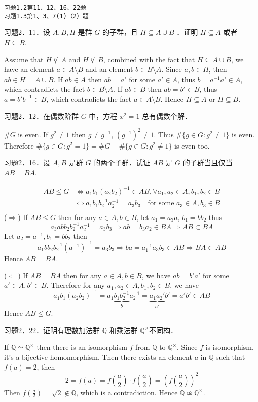 \begin{lstlisting}
习题1.2第11、12、16、22题
习题1.3第1、3、7(1)（2）题
\end{lstlisting}
\begin{exercise}
习题2．11．设 $A, B, H$ 是群 $G$ 的子群，且 $H \subseteq A \cup B$ ．证明 $H \subseteq A$ 或者 $H \subseteq B$.
\end{exercise}
Assume that $H\not\subseteq A$ and $H\not\subseteq B$, combined with the fact that $H\subseteq A\cup B$, we have an element $a\in A\setminus B$ and an element $b\in B\setminus A$. Since $a, b\in H$, then $ab\in H=A\cup B$. If $ab\in A$ then $ab=a'$ for some $a'\in A$, thus $b=a^{-1}a'\in A$, which contradicts the fact $b\in B\setminus A$. If $ab\in B$ then $ab=b'\in B$, thus $a=b'b^{-1}\in B$, which contradicts the fact $a\in A\setminus B$. Hence $H\subseteq A$ or $H\subseteq B$.

\begin{exercise}
习题2．12．在偶数阶群 $G$ 中，方程 $x^2=1$ 总有偶数个解．
\end{exercise}
$\#G$ is even. If $g^{2}\neq1$ then $g\neq g^{-1}$, $(g^{-1})^{2}\neq1$. Thus $\#\{ g\in G:g^{2}\neq1 \}$ is even. Therefore $\#\{ g\in G:g^{2}=1 \}=\#G- \#\{ g\in G:g^{2}\neq1 \}$ is even too.

\begin{exercise}
习题2．16．设 $A, B$ 是群 $G$ 的两个子群．试证 $A B$ 是 $G$ 的子群当且仅当 $A B=B A$.
\end{exercise}
\[
\begin{aligned}
AB\leq G & \iff a_1b_1 (a_2b_2)^{-1}\in AB,\forall a_1, a_2\in A, b_1, b_2\in B \\
 & \iff a_1b_1b_2 ^{-1}a_2 ^{-1}=a_3b_3\quad \text{for some }a_3\in A,b_3\in B \\
\end{aligned}
\]
($\Rightarrow$) If $AB\leq G$ then for any $a\in A, b\in B$, let $a_1=a_3a$, $b_1=bb_2$ thus
\[
a_3abb_2b_2 ^{-1} a_2^{-1}=a_3b_3\Rightarrow ab=b_3a_2\in BA\Rightarrow AB\subset BA
\]
Let $a_2=a^{-1},b_1=bb_2$ then
\[
a_1b b_2 b_2 ^{-1}(a^{-1})^{-1}=a_3b_3\Rightarrow ba=a_1 ^{-1}a_3b_3\in AB\Rightarrow BA\subset AB
\]
Hence $AB=BA$.

($\Leftarrow$) If $AB=BA$ then for any $a\in A, b\in B$, we have $ab=b'a'$ for some $a'\in A, b'\in B$. Therefore for any $a_1, a_2\in A, b_1, b_2\in B$, we have
\[
a_1b_1(a_2b_2)^{-1}=a_1\underbrace{ b_1b_2^{-1} }_{ b }a_2 ^{-1}=\underbrace{ a_1a_2' }_{ a' }b'=a'b'\in AB
\]
Hence $AB\leq G$.

\begin{exercise}
习题2．22．证明有理数加法群 $\mathbb{Q}$ 和乘法群 $\mathbb{Q}^{\times}$不同构．
\end{exercise}
If $\mathbb{Q}\simeq \mathbb{Q}^{\times}$ then there is an isomorphism $f$ from $\mathbb{Q}$ to $\mathbb{Q}^{\times}$. Since $f$ is isomorphism, it's a bijective homomorphism. Then there exists an element $a$ in $\mathbb{Q}$ such that $f(a)=2$, then
\[
2=f(a)=f\left( \frac{a}{2} \right)\cdot f\left( \frac{a}{2} \right)=\left( f\left( \frac{a}{2} \right) \right)^{2}
\]
Then $f\left( \frac{a}{2} \right)=\sqrt{ 2 }\not\in \mathbb{Q}$, which is a contradiction. Hence $\mathbb{Q}\not\simeq \mathbb{Q}^{\times}$.

